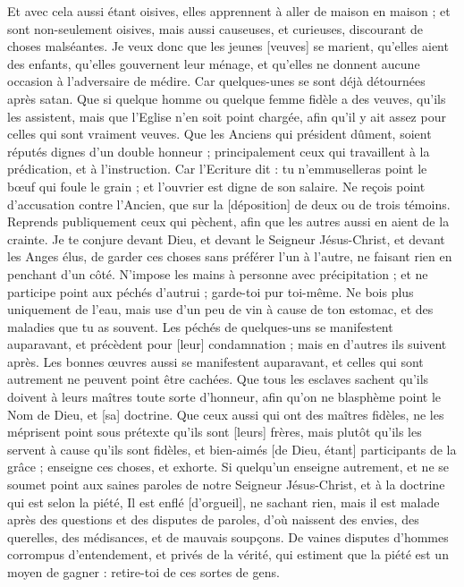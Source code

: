 \begin{multicols}{2}
Et avec cela aussi étant oisives, elles apprennent à aller de maison en maison ; et sont non-seulement oisives, mais aussi causeuses, et curieuses, discourant de choses malséantes.
Je veux donc que les jeunes [veuves] se marient, qu'elles aient des enfants, qu'elles gouvernent leur ménage, et qu'elles ne donnent aucune occasion à l'adversaire de médire.
Car quelques-unes se sont déjà détournées après satan.
Que si quelque homme ou quelque femme fidèle a des veuves, qu'ils les assistent, mais que l'Eglise n'en soit point chargée, afin qu'il y ait assez pour celles qui sont vraiment veuves.
Que les Anciens qui président dûment, soient réputés dignes d'un double honneur ; principalement ceux qui travaillent à la prédication, et à l'instruction.
Car l’Ecriture dit : tu n'emmuselleras point le bœuf qui foule le grain ; et l'ouvrier est digne de son salaire.
Ne reçois point d'accusation contre l'Ancien, que sur la [déposition] de deux ou de trois témoins.
Reprends publiquement ceux qui pèchent, afin que les autres aussi en aient de la crainte.
Je te conjure devant Dieu, et devant le Seigneur Jésus-Christ, et devant les Anges élus, de garder ces choses sans préférer l'un à l'autre, ne faisant rien en penchant d'un côté.
N'impose les mains à personne avec précipitation ; et ne participe point aux péchés d'autrui ; garde-toi pur toi-même.
Ne bois plus uniquement de l'eau, mais use d'un peu de vin à cause de ton estomac, et des maladies que tu as souvent.
Les péchés de quelques-uns se manifestent auparavant, et précèdent pour [leur] condamnation ; mais en d'autres ils suivent après.
Les bonnes œuvres aussi se manifestent auparavant, et celles qui sont autrement ne peuvent point être cachées.
\VerseOne{}Que tous les esclaves sachent qu'ils doivent à leurs maîtres toute sorte d'honneur, afin qu'on ne blasphème point le Nom de Dieu, et [sa] doctrine.
Que ceux aussi qui ont des maîtres fidèles, ne les méprisent point sous prétexte qu'ils sont [leurs] frères, mais plutôt qu'ils les servent à cause qu'ils sont fidèles, et bien-aimés [de Dieu, étant] participants de la grâce ; enseigne ces choses, et exhorte.
Si quelqu'un enseigne autrement, et ne se soumet point aux saines paroles de notre Seigneur Jésus-Christ, et à la doctrine qui est selon la piété,
Il est enflé [d'orgueil], ne sachant rien, mais il est malade après des questions et des disputes de paroles, d'où naissent des envies, des querelles, des médisances, et de mauvais soupçons.
De vaines disputes d'hommes corrompus d'entendement, et privés de la vérité, qui estiment que la piété est un moyen de gagner : retire-toi de ces sortes de gens.

\end{multicols}
